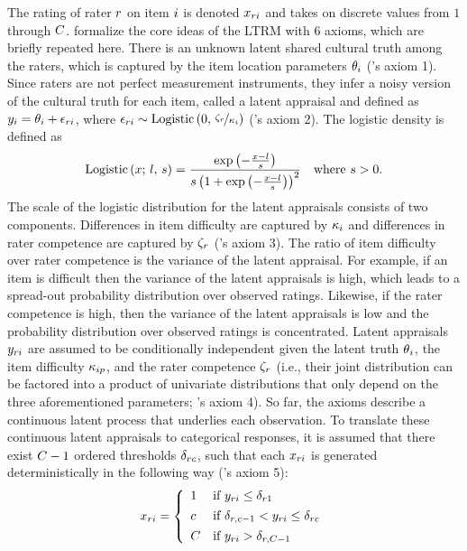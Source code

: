 \documentclass[a4paper,usenames,dvipsnames]{article}
\begin{document}
The rating of rater $r$ on item $i$ is denoted $x_{ri}$ and takes on discrete values from $1$ through $\Tncat$. \AB{} formalize the core ideas of the LTRM with 6 axioms, which are briefly repeated here. There is an unknown latent shared cultural truth among the raters, which is captured by the item location parameters $\theta_i$ (\AB{}'s axiom 1). Since raters are not perfect measurement instruments, they infer a noisy version of the cultural truth for each item, called a latent appraisal and defined as $y_{i} = \theta_i + \epsilon_{ri}$, where $\epsilon_{ri}\sim \text{Logistic}\left(0,\,\nicefrac{\zeta_r}{\kappa_i}\right)$ (\AB{}'s axiom 2). The logistic density is defined as
\begin{align*}
	\text{Logistic}\left(x;\,l,\,s\right) = \frac{\exp\left(-\frac{x - l}{s}\right)}{s\left(1 + \exp\left(-\frac{x - l}{s}\right)\right)^2}
	\quad \text{where $s > 0$}.
\end{align*}
The scale of the logistic distribution for the latent appraisals consists of two components. Differences in item difficulty are captured by $\kappa_i$ and differences in rater competence are captured by $\zeta_r$ (\AB{}'s axiom 3). The ratio of item difficulty over rater competence is the variance of the latent appraisal. For example, if an item is difficult then the variance of the latent appraisals is high, which leads to a spread-out probability distribution over observed ratings. Likewise, if the rater competence is high, then the variance of the latent appraisals is low and the probability distribution over observed ratings is concentrated. Latent appraisals $y_{ri}$ are assumed to be conditionally independent given the latent truth $\theta{}_i$, the item difficulty $\kappa_{ip}$, and the rater competence $\zeta_r$ (i.e., their joint distribution can be factored into a product of univariate distributions that only depend on the three aforementioned parameters; \AB{}'s axiom 4). So far, the axioms describe a continuous latent process that underlies each observation. To translate these continuous latent appraisals to categorical responses, it is assumed that there exist $\Tncat - 1$ ordered thresholds $\delta_{rc}$, such that each $x_{ri}$ is generated deterministically in the following way (\AB{}'s axiom 5):
\begin{align*}
	x_{\Irater\Iitem} = 
	\left\{\begin{array}{ll} 
	1		& \text{if }  \Appraisal_{\Irater\Iitem} \leq \Threshold_{\Irater 1} \\[4pt]
	\Incat	& \text{if }  \Threshold_{\Irater, \Incat-1} <  \Appraisal_{\Irater\Iitem} \leq \Threshold_{\Irater\Incat} \\[4pt]
	\Tncat	& \text{if }  \Appraisal_{\Irater\Iitem} > \Threshold_{\Irater, \Tncat-1}
	\end{array} \right.
\end{align*}
\end{document}
